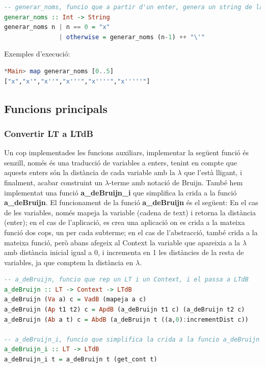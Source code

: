 \documentclass[10pt,a4paper]{article}
\begin{document}
\begin{lstlisting}[language=Haskell]
-- generar_noms, funcio que a partir d'un enter, genera un string de la forma de: x', on x tindra exactament n primes
generar_noms :: Int -> String
generar_noms n | n == 0 = "x"
               | otherwise = generar_noms (n-1) ++ "\'"
\end{lstlisting}

Exemples d'execució:

\begin{lstlisting}[language=Haskell]
*Main> map generar_noms [0..5]
["x","x'","x''","x'''","x''''","x'''''"]
\end{lstlisting}

\clearpage

\subsection{Funcions principals}

\subsubsection*{Convertir LT a LTdB}

Un cop implementades les funcions auxiliars, implementar la següent funció és senzill, només és una traducció de variables a enters, tenint en compte que aquests enters són la distància de cada variable amb la $\lambda$ que l'està lligant, i finalment, acabar construint un $\lambda$-terme amb notació de Bruijn. També hem implementat una funció \textbf{a\_deBruijn\_i} que simplifica la crida a la funció \textbf{a\_deBruijn}. El funcionament de la funció \textbf{a\_deBruijn} és el següent: En el cas de les variables, només mapeja la variable (cadena de text) i retorna la distància (enter); en el cas de l'aplicació, es crea una aplicació on es crida a la mateixa funció dos cops, un per cada subterme; en el cas de l'abstracció, també crida a la mateixa funció, però abans afegeix al Context la variable que apareixia a la $\lambda$ amb distància inicial igual a 0, i incrementa en 1 les distàncies de la resta de variables, ja que comptem la distància en $\lambda$.

\begin{lstlisting}[language=Haskell]
-- a_deBruijn, funcio que rep un LT i un Context, i el passa a LTdB
a_deBruijn :: LT -> Context -> LTdB
a_deBruijn (Va a) c = VadB (mapeja a c)
a_deBruijn (Ap t1 t2) c = ApdB (a_deBruijn t1 c) (a_deBruijn t2 c)
a_deBruijn (Ab a t) c = AbdB (a_deBruijn t ((a,0):incrementDist c))

-- a_deBruijn_i, funcio que simplifica la crida a la funcio a_deBruijn
a_deBruijn_i :: LT -> LTdB
a_deBruijn_i t = a_deBruijn t (get_cont t)
\end{lstlisting}
\end{document}
